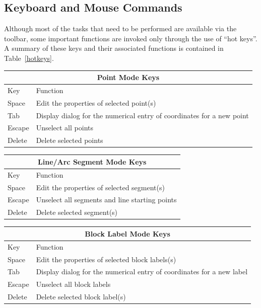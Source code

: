 \documentclass[12pt]{report}
\begin{document}
\subsection{Keyboard and Mouse Commands}
Although most of the tasks that need to be performed are available
via the toolbar, some important functions are invoked only through
the use of ``hot keys''. A summary of these keys and their
associated functions is contained in Table~\ref{hotkeys}.

\begin{table}
\centering
\begin{tabular}{|l|l|} \hline \hline
\multicolumn{2}{|c|}{Point Mode Keys} \\ \hline \hline
 Key    & Function \\ \hline \hline
 Space  & Edit the properties of selected point(s) \\ \hline
 Tab    & Display dialog for the numerical entry of coordinates for a new point \\ \hline
 Escape & Unselect all points \\ \hline
 Delete & Delete selected points \\ \hline \hline
\end{tabular}

\vspace*{12pt}
\begin{tabular}{|l|l|} \hline \hline
\multicolumn{2}{|c|}{Line/Arc Segment Mode Keys} \\ \hline \hline
 Key    & Function \\ \hline \hline
 Space  & Edit the properties of selected segment(s) \\ \hline
 Escape & Unselect all segments and line starting points \\ \hline
 Delete & Delete selected segment(s) \\ \hline \hline
\end{tabular}

\vspace*{12pt}
\begin{tabular}{|l|l|} \hline \hline
\multicolumn{2}{|c|}{Block Label Mode Keys} \\ \hline \hline
 Key    & Function \\ \hline \hline
 Space  & Edit the properties of selected block labels(s) \\ \hline
 Tab    & Display dialog for the numerical entry of coordinates for a new label \\ \hline
 Escape & Unselect all block labels  \\ \hline
 Delete & Delete selected block label(s) \\ \hline \hline
\end{tabular}


\end{table}
\end{document}

